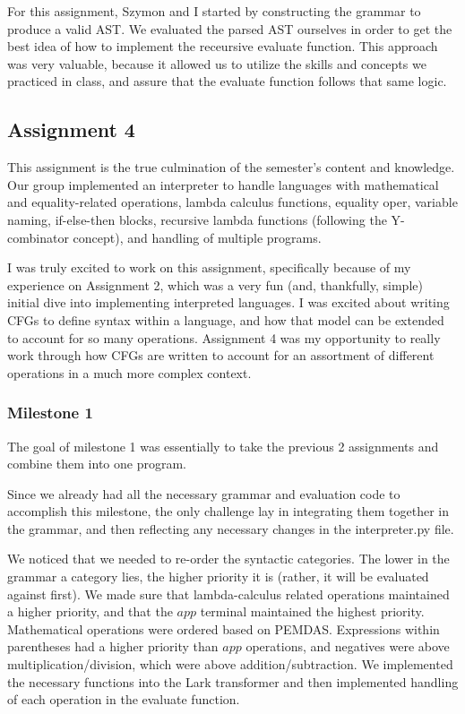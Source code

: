 \documentclass{article}
\theoremstyle{theorem}
\theoremstyle{definition}
\theoremstyle{remark}
\begin{document}
For this assignment, Szymon and I started by constructing the grammar to produce a valid AST. We evaluated the parsed AST ourselves in order to get the best idea of how to implement the receursive evaluate function. This approach was very valuable, because it allowed us to utilize the skills and concepts we practiced in class, and assure that the evaluate function follows that same logic.

\subsection{Assignment 4}

This assignment is the true culmination of the semester's content and knowledge. Our group implemented an interpreter to handle languages with mathematical and equality-related operations, lambda calculus functions, equality oper, variable naming, if-else-then blocks, recursive lambda functions (following the Y-combinator concept), and handling of multiple programs. 

I was truly excited to work on this assignment, specifically because of my experience on Assignment 2, which was a very fun (and, thankfully, simple) initial dive into implementing interpreted languages. I was excited about writing CFGs to define syntax within a language, and how that model can be extended to account for so many operations. Assignment 4 was my opportunity to really work through how CFGs are written to account for an assortment of different operations in a much more complex context.

\subsubsection{Milestone 1}

The goal of milestone 1 was essentially to take the previous 2 assignments and combine them into one program. 

Since we already had all the necessary grammar and evaluation code to accomplish this milestone, the only challenge lay in integrating them together in the grammar, and then reflecting any necessary changes in the interpreter.py file. 

We noticed that we needed to re-order the syntactic categories. The lower in the grammar a category lies, the higher priority it is (rather, it will be evaluated against first). We made sure that lambda-calculus related operations maintained a higher priority, and that the $app$ terminal maintained the highest priority. Mathematical operations were ordered based on PEMDAS. Expressions within parentheses had a higher priority than $app$ operations, and negatives were above multiplication/division, which were above addition/subtraction. We implemented the necessary functions into the Lark transformer and then implemented handling of each operation in the evaluate function.  
\end{document}
